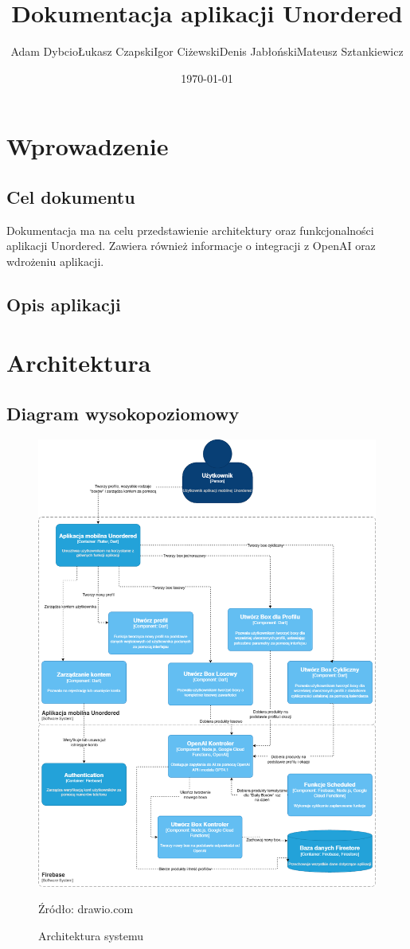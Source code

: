 \documentclass[a4paper, 12pt]{article}
\title{Dokumentacja aplikacji Unordered}
\author{Adam Dybcio\endline Łukasz Czapski\endline Igor Ciżewski\endline Denis Jabłoński\endline Mateusz Sztankiewicz}
\date{\today}
\begin{document}
\maketitle
\newpage
\tableofcontents
\newpage

\section{Wprowadzenie}
\subsection{Cel dokumentu}
Dokumentacja ma na celu przedstawienie architektury oraz funkcjonalności aplikacji Unordered.
Zawiera również informacje o integracji z OpenAI oraz wdrożeniu aplikacji.

\subsection{Opis aplikacji}

\newpage
\section{Architektura}
\subsection{Diagram wysokopoziomowy}
\begin{figure}[ht]
    \centering
    \includegraphics[width=.8\textwidth]{images/unordered.c4.png}
    \caption{Architektura systemu}{Źródło: drawio.com}
    \label{fig:arch}
\end{figure}
\end{document}
